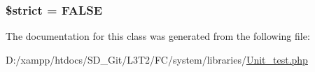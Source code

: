 \subsubsection[{\$strict}]{\setlength{\rightskip}{0pt plus 5cm}\$strict = F\+A\+L\+S\+E}\label{class_c_i___unit__test_a856bf794dded1ba70be4dfae635a1b06}


The documentation for this class was generated from the following file\+:\begin{DoxyCompactItemize}
\item 
D\+:/xampp/htdocs/\+S\+D\+\_\+\+Git/\+L3\+T2/\+F\+C/system/libraries/\hyperlink{_unit__test_8php}{Unit\+\_\+test.\+php}\end{DoxyCompactItemize}
